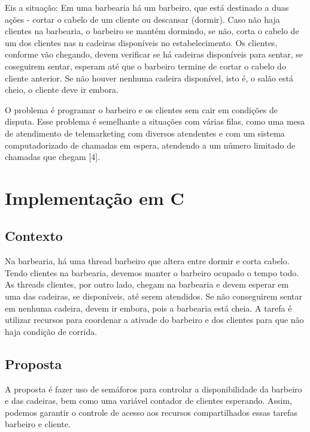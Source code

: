 \documentclass[
	12pt,				%
	openright,			%
	oneside,			%
	a4paper,			%
	chapter=TITLE,		%
	english,			%
	french,				%
	spanish,			%
	brazil				%
	]{abntex2}
\theoremstyle{definition}
\begin{document}
Eis a situação: Em uma barbearia há um barbeiro, que está destinado a duas ações - cortar o cabelo de um cliente ou descansar (dormir). Caso não haja clientes na barbearia, o barbeiro se mantém dormindo, se não, corta o cabelo de um dos clientes nas n cadeiras disponíveis no estabelecimento. Os clientes, conforme vão chegando, devem verificar se há cadeiras disponíveis para sentar, se coseguirem sentar, esperam até que o barbeiro termine de cortar o cabelo do cliente anterior. Se não houver nenhuma cadeira disponível, isto é, o salão está cheio, o cliente deve ir embora. 

O problema é programar o barbeiro e os clientes sem cair em condições de disputa. Esse problema é semelhante a situações com várias filas, como uma mesa de atendimento de telemarketing com diversos atendentes e com um sistema computadorizado de chamadas em espera, atendendo a um número limitado de chamadas que chegam [4].

\section{Implementação em C}
\subsection{Contexto}
Na barbearia, há uma thread barbeiro que altera entre dormir e corta cabelo. Tendo clientes na barbearia, devemos manter o barbeiro ocupado o tempo todo. As threads clientes, por outro lado, chegam na barbearia e devem esperar em uma das cadeiras, se disponíveis, até serem atendidos. Se não conseguirem sentar em nenhuma cadeira, devem ir embora, pois a barbearia está cheia. A tarefa é utilizar recursos para coordenar a ativade do barbeiro e dos clientes para que não haja condição de corrida.

\subsection{Proposta}
A proposta é fazer uso de semáforos para controlar a disponibilidade da barbeiro e das cadeiras, bem como uma variável contador de clientes esperando. Assim, podemos garantir o controle de acesso aos recursos compartilhados essas tarefas barbeiro e cliente.
\end{document}
